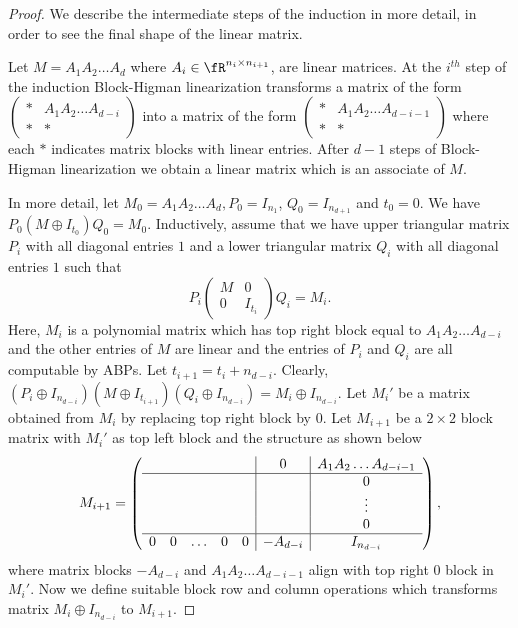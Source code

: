 \begin{proof}
We describe the intermediate steps of the induction in more detail, in
order to see the final shape of the linear matrix.

Let $M= A_1A_2\ldots A_d$ where $A_i \in \fR ^{n_i \times n_{i+1}}$,
are linear matrices. At the $i^{th}$ step of the induction
Block-Higman linearization transforms a matrix of the form $\left(
\begin{array}{cc}
* & A_1A_2\ldots A_{d-i} \\
%
* & *
\end{array} 
\right)$ into a matrix of the form $\left(
\begin{array}{cc}
* & A_1A_2\ldots A_{d-i-1} \\
%
* & *
\end{array} 
\right)$ 
where each $*$ indicates matrix blocks with linear entries. After
$d-1$ steps of Block-Higman linearization we obtain a linear matrix
which is an associate of $M$. 

In more detail, let $M_0=A_1A_2\ldots A_d, P_0=I_{n_1}$,
$Q_0=I_{n_{d+1}}$ and $t_0=0$. We have
$P_0 (M \oplus I_{t_0}) Q_0 = M_0$. Inductively, assume that we have
upper triangular matrix $P_i$ with all diagonal entries $1$ and a
lower triangular matrix $Q_i$ with all diagonal entries $1$ such that
\[ P_i \left(
\begin{array}{cc}
M & 0 \\
%
0 & I_{t_i}
\end{array} 
\right)Q_i = M_i.
\] 
Here, $M_i$ is a polynomial matrix which has top right block equal to
$A_1A_2 \ldots A_{d-i}$ and the other entries of $M$ are linear and
the entries of $P_i$ and $Q_i$ are all computable by ABPs. Let
$t_{i+1}=t_i + n_{d-i}$. Clearly,
$(P_i \oplus I_{n_{d-i}}) (M \oplus I_{t_{i+1}})(Q_i \oplus
I_{n_{d-i}})= M_i \oplus I_{n_{d-i}}$. Let $M_i'$ be a matrix obtained
from $M_i$ by replacing top right block by $0$. Let $M_{i+1}$ be a
$2\times 2$ block matrix with $M_i'$ as top left block and the
structure as shown below
\[
M_{i+1}= \left(
\begin{array}{ccccc|c|c}
 &&&&& 0& A_1A_2\ldots A_{d-i-1} \\
\hline
%
&&&&& & 0\\
&&&&& & \vdots\\
&&&&& & 0\\
%
\hline
0& 0& \ldots & 0 & 0& -A_{d-i} & I_{n_{d-i}}
\end{array} 
\right),
\]
where matrix blocks $-A_{d-i}$ and $A_1A_2\ldots A_{d-i-1}$ align with top right $0$ block in $M_i'$. Now we define suitable block row and column operations which transforms matrix $M_i \oplus I_{n_{d-i}}$ to $M_{i+1}$. 


\end{proof}
